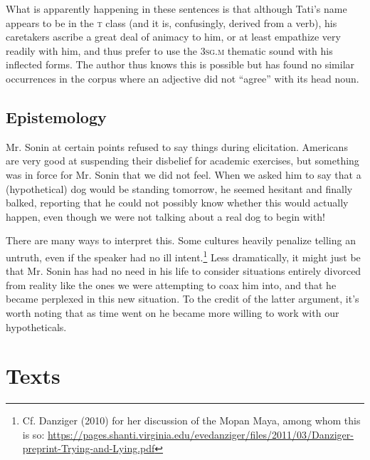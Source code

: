 \documentclass[pdftex,12pt,letterpaper]{article}
\begin{document}
\noindent What is apparently happening in these sentences is that although Tati's name appears to be in the \textsc{t} class (and it is, confusingly, derived from a verb), his caretakers ascribe a great deal of animacy to him, or at least empathize very readily with him, and thus prefer to use the \textsc{3sg.m} thematic sound with his inflected forms. The author thus knows this is possible but has found no similar occurrences in the corpus where an adjective did not ``agree'' with its head noun.
 
\subsection{Epistemology}

 Mr. Sonin at certain points refused to say things during elicitation. Americans are very good at suspending their disbelief for academic exercises, but something was in force for Mr. Sonin that we did not feel. When we asked him to say that a (hypothetical) dog would be standing tomorrow, he seemed hesitant and finally balked, reporting that he could not possibly know whether this would actually happen, even though we were not talking about a real dog to begin with! 
 
 There are many ways to interpret this. Some cultures heavily penalize telling an untruth, even if the speaker had no ill intent.\footnote{Cf. Danziger (2010) for her discussion of the Mopan Maya, among whom this is so: \url{https://pages.shanti.virginia.edu/evedanziger/files/2011/03/Danziger-preprint-Trying-and-Lying.pdf}} Less dramatically, it might just be that Mr. Sonin has had no need in his life to consider situations entirely divorced from reality like the ones we were attempting to coax him into, and that he became perplexed in this new situation. To the credit of the latter argument, it's worth noting that as time went on he became more willing to work with our hypotheticals.























 \pagebreak
 \section{Texts}
\end{document}
